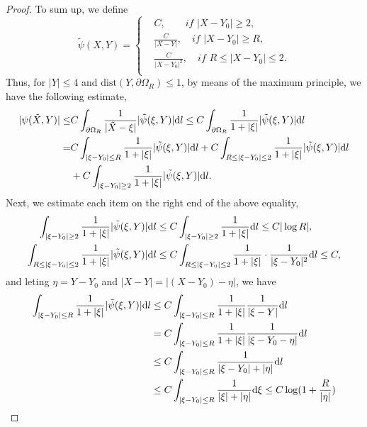 \documentclass[11pt,reqno]{amsart}%
\theoremstyle{definition}
\theoremstyle{remark}
\begin{document}
\begin{proof}
To sum up,  we define
\begin{equation}\nonumber
\tilde{\psi}(X,Y)=\left\{\begin{aligned}
 &C, \qquad  if\,\, |X-Y_{0}|\geq 2, \\
&\frac{C}{|X-Y|}, \quad  if\,\, |X-Y_{0}|\geq R,\\
&\frac{C}{|X-Y_{0}|^{2}}, \quad  if\,\, R\leq|X-Y_{0}|\leq 2.\\
\end{aligned}  \right.
\end{equation}
Thus, for $|Y|\leq 4$ and $\text{dist}(Y,\partial\Omega_{R})\leq 1$, by means of the maximum principle, we have the following estimate, 
\begin{align}
|\psi(\tilde{X},Y)|\leq & C\int_{\partial\Omega_{R}}\frac{1}{|\tilde{X}-\xi|}|\tilde{\psi}(\xi,Y)|{\rm d}l
\leq C\int_{\partial\Omega_{R}}\frac{1}{1+|\xi|}|\tilde{\psi}(\xi,Y)|{\rm d}l\nonumber\\
=& C\int_{|\xi-Y_{0}|\leq R}\frac{1}{1+|\xi|}|\tilde{\psi}(\xi,Y)|{\rm d}l
+C\int_{R\leq|\xi-Y_{0}|\leq 2}\frac{1}{1+|\xi|}|\tilde{\psi}(\xi,Y)|{\rm d}l\nonumber\\
&+C\int_{|\xi-Y_{0}|\geq 2}\frac{1}{1+|\xi|}|\tilde{\psi}(\xi,Y)|{\rm d}l.\nonumber
\end{align}
Next, we estimate each item on the right end of the above equality,
\begin{align}
\int_{|\xi-Y_{0}|\geq 2}\frac{1}{1+|\xi|}|\tilde{\psi}(\xi,Y)|{\rm d}l&\leq C \int_{|\xi-Y_{0}|\geq 2}\frac{1}{1+|\xi|}{\rm d}l
\leq C |\log R|,\nonumber\\
\int_{R\leq|\xi-Y_{0}|\leq 2}\frac{1}{1+|\xi|}|\tilde{\psi}(\xi,Y)|{\rm d}l&\leq C \int_{R\leq|\xi-Y_{0}|\leq 2}\frac{1}{1+|\xi|}\cdot\frac{1}{|\xi-Y_{0}|^{2}}{\rm d}l
\leq C ,\nonumber
\end{align}
and leting $\eta=Y-Y_{0}$ and $|X-Y|=|(X-Y_{0})-\eta|$,   we have
\begin{align}
\int_{|\xi-Y_{0}|\leq R}\frac{1}{1+|\xi|}|\tilde{\psi}(\xi,Y)|{\rm d}l&\leq C \int_{|\xi-Y_{0}|\leq R}\frac{1}{1+|\xi|}\frac{1}{|\xi-Y|}{\rm d}l\nonumber\\
&=C\int_{|\xi-Y_{0}|\leq R}\frac{1}{1+|\xi|}\frac{1}{|\xi-Y_{0}-\eta|}{\rm d}l\nonumber\\
&\leq  C \int_{|\xi-Y_{0}|\leq R}\frac{1}{|\xi-Y_{0}|+|\eta|}{\rm d}l\nonumber\\
&\leq  C \int_{|\xi-Y_{0}|\leq R}\frac{1}{|\xi|+|\eta|}{\rm d}\xi
\leq C\log (1+\frac{R}{|\eta|})\nonumber\\

\end{align}
\end{proof}
\end{document}
